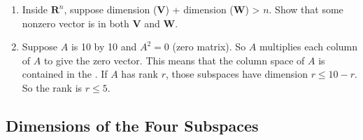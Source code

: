 \documentclass[14pt, a4paper]{article}
\begin{document}
\begin{enumerate}[resume]
    \item Inside $\mathbf{R}^n$, suppose dimension ($\mathbf{V}$) + dimension ($\mathbf{W}$) > $n$. Show that some nonzero vector is in both $\mathbf{V}$ and $\mathbf{W}$.

    \item Suppose $A$ is 10 by 10 and $A^2 = 0$ (zero matrix). So $A$ multiplies each column of $A$ to give the zero vector. This means that the column space of $A$ is contained in the \underline{\hspace{2cm}}. If $A$ has rank $r$, those subspaces have dimension $r \le 10 - r$. So the rank is $r \le 5$.
\end{enumerate}



\subsection{Dimensions of the Four Subspaces}
\end{document}
